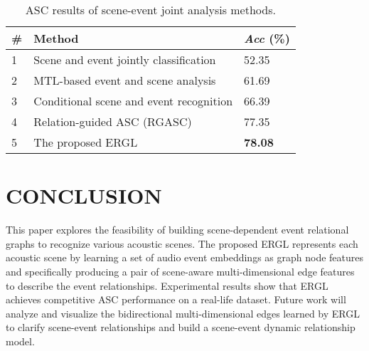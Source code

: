 \documentclass{article}
\begin{document}
\vspace{-0.2cm}
\begin{table}[H]\footnotesize
\setlength{\abovecaptionskip}{0cm}   \setlength{\belowcaptionskip}{0.cm}
\renewcommand\tabcolsep{1pt} 
	\centering
	\caption{ASC results of scene-event joint analysis methods.}
	\begin{tabular}{
	p{0.7cm}<{\centering}|
	p{}<{\centering}|
	p{1.4cm}<{\centering}
	}
	    \hline
		\# & Method &  \textsl{Acc} (\%)\\
		\hline
		1 & Scene and event jointly classification \cite{Bear2019TowardsJS} &   52.35 \\ 
		
		2 & MTL-based event and scene analysis   \cite{tonami2021joint} &    61.69 \\
		
		3 & Conditional scene and event recognition \cite{komatsu2020scene} &   66.39 \\ 
		
		4 & Relation-guided ASC (RGASC) \cite{RGASC} &  77.35 \\

  5 & The proposed ERGL &  \textbf{78.08} \\
	
	\hline
	\end{tabular}
	\label{tab:asc_joint}
\end{table}


\vspace{-0.6cm}
\section{CONCLUSION}
\label{sec:CONCLUSION}

\vspace{-0.2cm} 
This paper explores the feasibility of building scene-dependent event relational graphs to recognize various acoustic scenes. 
The proposed ERGL represents each acoustic scene by learning a set of audio event embeddings as graph node features and specifically producing a pair of scene-aware multi-dimensional edge features to describe the event relationships. 
Experimental results show that ERGL achieves competitive ASC performance on a real-life dataset.
Future work will analyze and visualize the bidirectional multi-dimensional edges learned by ERGL to clarify scene-event relationships and build a scene-event dynamic relationship model. 

 



 

\vfill\pagebreak

\label{sec:refs}




\end{document}
